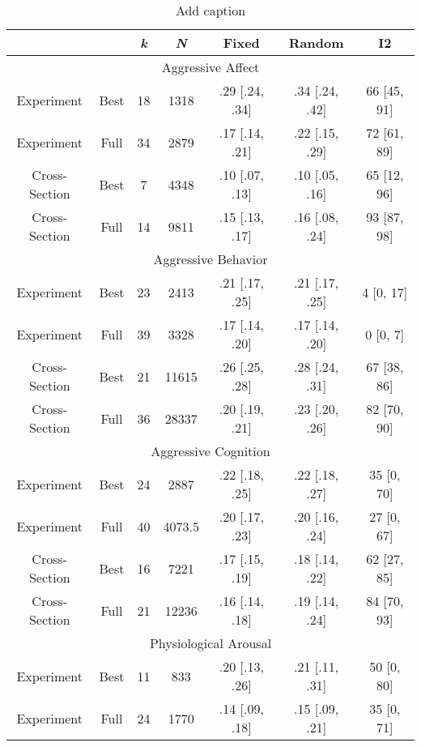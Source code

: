 \begin{table}[htbp]
  \centering
  \caption{Add caption}
    \begin{tabular}{ccccccc}
    \toprule
          &       & \textit{k} & \textit{N} & Fixed & Random & I2 \\
    \midrule
    \multicolumn{7}{c}{Aggressive Affect} \\
    Experiment & Best  & 18    & 1318  & .29 [.24, .34] & .34 [.24, .42] & 66 [45, 91] \\
    Experiment & Full  & 34    & 2879  & .17 [.14, .21] & .22 [.15, .29] & 72 [61, 89] \\
    Cross-Section & Best  & 7     & 4348  & .10 [.07, .13] & .10 [.05, .16] & 65 [12, 96] \\
    Cross-Section & Full  & 14    & 9811  & .15 [.13, .17] & .16 [.08, .24] & 93 [87, 98] \\
    \multicolumn{7}{c}{Aggressive Behavior} \\
    Experiment & Best  & 23    & 2413  & .21 [.17, .25] & .21 [.17, .25] &  4 [0, 17] \\
    Experiment & Full  & 39    & 3328  & .17 [.14, .20] & .17 [.14, .20] & 0 [0, 7] \\
    Cross-Section & Best  & 21    & 11615 & .26 [.25, .28] & .28 [.24, .31] & 67 [38, 86] \\
    Cross-Section & Full  & 36    & 28337 & .20 [.19, .21] & .23 [.20, .26] & 82 [70, 90] \\
    \multicolumn{7}{c}{Aggressive Cognition} \\
    Experiment & Best  & 24    & 2887  & .22 [.18, .25] & .22 [.18, .27] & 35 [0, 70] \\
    Experiment & Full  & 40    & 4073.5 & .20 [.17, .23] & .20 [.16, .24] & 27 [0, 67] \\
    Cross-Section & Best  & 16    & 7221  & .17 [.15, .19] & .18 [.14, .22] & 62 [27, 85] \\
    Cross-Section & Full  & 21    & 12236 & .16 [.14, .18] & .19 [.14, .24] & 84 [70, 93] \\
    \multicolumn{7}{c}{Physiological Arousal} \\
    Experiment & Best  & 11    & 833   & .20 [.13, .26] & .21 [.11, .31] & 50 [0, 80] \\
    Experiment & Full  & 24    & 1770  & .14 [.09, .18] & .15 [.09, .21] & 35 [0, 71] \\
    \bottomrule
    \end{tabular}%
  \label{tab:addlabel}%
\end{table}%
